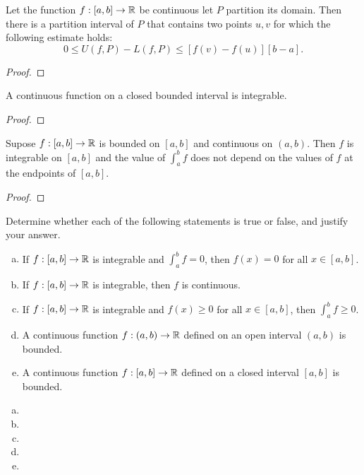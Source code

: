 \documentclass[letterpaper, twoside, 12pt]{book}
\begin{document}
\begin{lemma}[6.17]
  Let the function \(f:[a,b]\to\mathbb R\) be continuous let \(P\) partition
  its domain. Then there is a partition interval of \(P\) that contains two
  points \(u,v\) for which the following estimate holds:
  \[
    0
      \leq
    U(f,P)-L(f,P)
      \leq
    [f(v)-f(u)][b-a]
  .\]
\end{lemma}
\begin{proof}

\end{proof}


\begin{theorem}[6.18]
  A continuous function on a closed bounded interval is integrable.
\end{theorem}
\begin{proof}

\end{proof}


\begin{theorem}[6.19]
  Supose \(f:[a,b]\to\mathbb R\) is bounded on \([a,b]\) and continuous on
  \((a,b)\). Then \(f\) is integrable on \([a,b]\) and the value of
  \(\int_a^b f\) does not depend on the values of \(f\) at the endpoints
  of \([a,b]\).
\end{theorem}
\begin{proof}

\end{proof}

\begin{exercise}[1]
  Determine whether each of the following statements is true or false, and
  justify your answer.
  \begin{enumerate}[(a)]
    \item If \(f:[a,b]\to\mathbb R\) is integrable and \(\int_a^b f=0\), then
      \(f(x)=0\) for all \(x\in[a,b]\).
    \item If \(f:[a,b]\to\mathbb R\) is integrable, then \(f\) is continuous.
    \item If \(f:[a,b]\to\mathbb R\) is integrable and \(f(x)\geq0\) for all
      \(x\in[a,b]\), then \(\int_a^b f\geq 0\).
    \item A continuous function \(f:(a,b)\to\mathbb R\) defined on an open interval
      \((a,b)\) is bounded.
    \item A continuous function \(f:[a,b]\to\mathbb R\) defined on a closed interval
      \([a,b]\) is bounded.
  \end{enumerate}
\end{exercise}
\begin{solution}
  \begin{enumerate}[(a)]
    \item
    \item
    \item
    \item
    \item
  \end{enumerate}
\end{solution}
\end{document}
